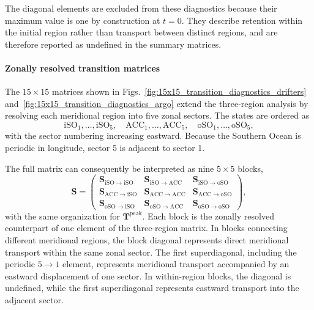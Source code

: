 \documentclass[
  draft
]{agujournal2025}
\begin{document}
                The diagonal elements are excluded from these diagnostics because their maximum value is one by construction at $t=0$. They describe retention within the initial region rather than transport between distinct regions, and are therefore reported as undefined in the summary matrices.
    
    
            \paragraph{Zonally resolved transition matrices}
                The $15\times15$ matrices shown in Figs.~\ref{fig:15x15_transition_diagnostics_drifters} and~\ref{fig:15x15_transition_diagnostics_argo} extend the three-region analysis by resolving each meridional region into five zonal sectors. The states are ordered as
                \begin{equation}
                    \mathrm{iSO}_1,\ldots,\mathrm{iSO}_5,\quad
                    \mathrm{ACC}_1,\ldots,\mathrm{ACC}_5,\quad
                    \mathrm{oSO}_1,\ldots,\mathrm{oSO}_5,
                \end{equation}
                with the sector numbering increasing eastward. Because the  Southern Ocean is periodic in longitude, sector 5 is adjacent to sector 1.
    
                The full matrix can consequently be interpreted as nine
                $5\times5$ blocks,
                \begin{equation}
                    \mathbf{S} =
                    \begin{pmatrix}
                        \mathbf{S}_{\mathrm{iSO} \rightarrow \mathrm{iSO}} &
                        \mathbf{S}_{\mathrm{iSO} \rightarrow \mathrm{ACC}} &
                        \mathbf{S}_{\mathrm{iSO} \rightarrow \mathrm{oSO}}
                        \\
                        \mathbf{S}_{\mathrm{ACC} \rightarrow \mathrm{iSO}} &
                        \mathbf{S}_{\mathrm{ACC} \rightarrow \mathrm{ACC}} &
                        \mathbf{S}_{\mathrm{ACC} \rightarrow \mathrm{oSO}}
                        \\
                        \mathbf{S}_{\mathrm{oSO} \rightarrow \mathrm{iSO}} &
                        \mathbf{S}_{\mathrm{oSO} \rightarrow \mathrm{ACC}} &
                        \mathbf{S}_{\mathrm{oSO} \rightarrow \mathrm{oSO}}
                    \end{pmatrix},
                \end{equation}
                with the same organization for $\mathbf{T}^{\mathrm{peak}}$. Each block is the zonally resolved counterpart of one element of the three-region matrix. In blocks connecting different meridional regions, the block diagonal represents direct meridional transport within the same zonal sector. The first superdiagonal, including the periodic $5\rightarrow1$ element, represents meridional transport accompanied by an eastward displacement of one sector. In within-region blocks, the diagonal is undefined, while the first superdiagonal represents eastward transport into the adjacent sector.
    
\end{document}
